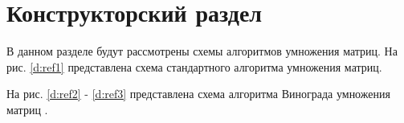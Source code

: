 \chapter{Конструкторский раздел}
\label{cha:design}
В данном разделе будут рассмотрены схемы алгоритмов умножения матриц.
На рис. \ref{d:ref1} представлена схема стандартного алгоритма умножения матриц.

\begin{figure}[ht!]
\end{figure}

На рис. \ref{d:ref2} - \ref{d:ref3} представлена схема алгоритма Винограда умножения матриц .


\begin{figure}[ht!]
\end{figure}

